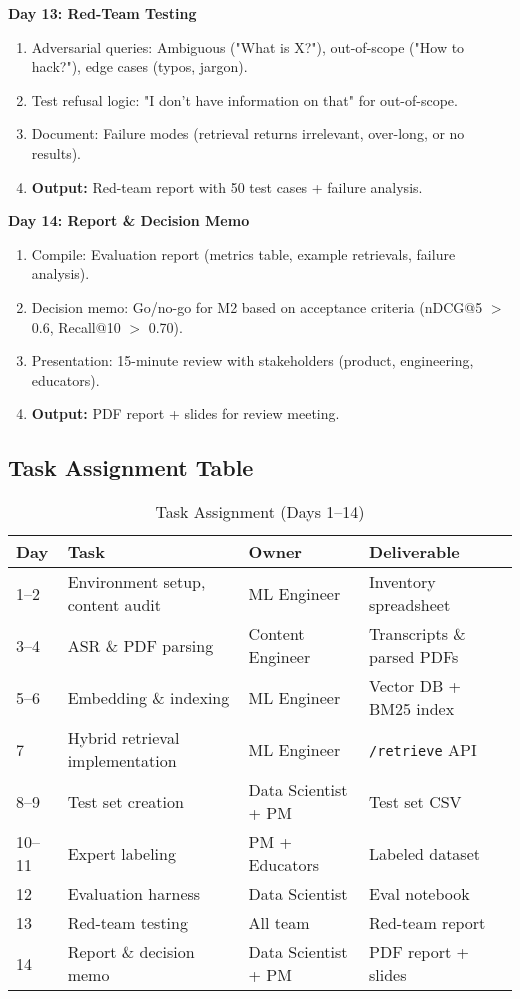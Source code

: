\documentclass[11pt,letterpaper]{article}
\begin{document}
\textbf{Day 13: Red-Team Testing}
\begin{enumerate}
\item Adversarial queries: Ambiguous ("What is X?"), out-of-scope ("How to hack?"), edge cases (typos, jargon).
\item Test refusal logic: "I don't have information on that" for out-of-scope.
\item Document: Failure modes (retrieval returns irrelevant, over-long, or no results).
\item \textbf{Output:} Red-team report with 50 test cases + failure analysis.
\end{enumerate}

\textbf{Day 14: Report \& Decision Memo}
\begin{enumerate}
\item Compile: Evaluation report (metrics table, example retrievals, failure analysis).
\item Decision memo: Go/no-go for M2 based on acceptance criteria (nDCG@5 $>$ 0.6, Recall@10 $>$ 0.70).
\item Presentation: 15-minute review with stakeholders (product, engineering, educators).
\item \textbf{Output:} PDF report + slides for review meeting.
\end{enumerate}

\subsection{Task Assignment Table}\label{subsec:task-assignment}

\begin{table}[H]
\centering
\small
\begin{tabular}{@{}p{2cm}p{5cm}p{3cm}p{3cm}@{}}
\toprule
\textbf{Day} & \textbf{Task} & \textbf{Owner} & \textbf{Deliverable} \\
\midrule
1--2 & Environment setup, content audit & ML Engineer & Inventory spreadsheet \\
3--4 & ASR \& PDF parsing & Content Engineer & Transcripts \& parsed PDFs \\
5--6 & Embedding \& indexing & ML Engineer & Vector DB + BM25 index \\
7 & Hybrid retrieval implementation & ML Engineer & \texttt{/retrieve} API \\
8--9 & Test set creation & Data Scientist + PM & Test set CSV \\
10--11 & Expert labeling & PM + Educators & Labeled dataset \\
12 & Evaluation harness & Data Scientist & Eval notebook \\
13 & Red-team testing & All team & Red-team report \\
14 & Report \& decision memo & Data Scientist + PM & PDF report + slides \\
\bottomrule
\end{tabular}
\caption{Task Assignment (Days 1--14)}
\end{table}
\end{document}
